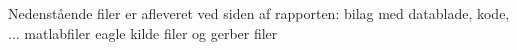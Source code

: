 Nedenstående filer er afleveret ved siden af rapporten:
bilag med datablade, kode, ...
matlabfiler
eagle kilde filer og gerber filer


